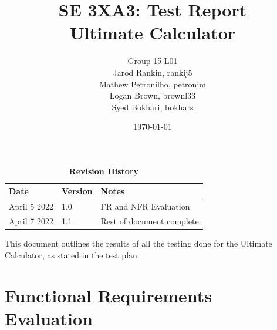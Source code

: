 \documentclass[12pt, titlepage]{article}
\title{SE 3XA3: Test Report\\Ultimate Calculator}
\author{Group 15 L01
		\\ Jarod Rankin, rankij5
		\\ Mathew Petronilho, petronim
		\\ Logan Brown, brownl33
		\\ Syed Bokhari, bokhars
}
\date{\today}
\begin{document}
\maketitle

\tableofcontents
\listoftables
\listoffigures

\begin{table}[bp]
\caption{\bf Revision History}
\begin{tabularx}{\textwidth}{p{3cm}p{2cm}X}
\toprule {\bf Date} & {\bf Version} & {\bf Notes}\\
\midrule
April 5 2022 & 1.0 & FR and NFR Evaluation\\
April 7 2022 & 1.1 & Rest of document complete\\
\bottomrule
\end{tabularx}
\end{table}

\newpage


This document outlines the results of all the testing done for the Ultimate Calculator, as stated in the test plan.

\section{Functional Requirements Evaluation}
\end{document}
